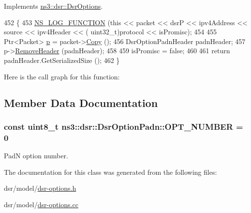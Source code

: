 Implements \hyperlink{classns3_1_1dsr_1_1DsrOptions_ac34fb87a95464f3ea9d82ad12253a5cc}{ns3\+::dsr\+::\+Dsr\+Options}.


\begin{DoxyCode}
452 \{
453   \hyperlink{log-macros-disabled_8h_a90b90d5bad1f39cb1b64923ea94c0761}{NS\_LOG\_FUNCTION} (\textcolor{keyword}{this} << packet << dsrP << ipv4Address << source << ipv4Header << (
      uint32\_t)protocol << isPromisc);
454 
455   Ptr<Packet> \hyperlink{lte__link__budget_8m_ac9de518908a968428863f829398a4e62}{p} = packet->\hyperlink{classns3_1_1Packet_a5d5c70802a5f77fc5f0001e0cfc1898b}{Copy} ();
456   DsrOptionPadnHeader padnHeader;
457   p->\hyperlink{classns3_1_1Packet_a0961eccf975d75f902d40956c93ba63e}{RemoveHeader} (padnHeader);
458 
459   isPromisc = \textcolor{keyword}{false};
460 
461   \textcolor{keywordflow}{return} padnHeader.GetSerializedSize ();
462 \}
\end{DoxyCode}


Here is the call graph for this function\+:




\subsection{Member Data Documentation}
\subsubsection[{\texorpdfstring{O\+P\+T\+\_\+\+N\+U\+M\+B\+ER}{OPT_NUMBER}}]{\setlength{\rightskip}{0pt plus 5cm}const uint8\+\_\+t ns3\+::dsr\+::\+Dsr\+Option\+Padn\+::\+O\+P\+T\+\_\+\+N\+U\+M\+B\+ER = 0\hspace{0.3cm}{\ttfamily [static]}}\hypertarget{classns3_1_1dsr_1_1DsrOptionPadn_a42477839592a01edfafe85df30b4e441}{}\label{classns3_1_1dsr_1_1DsrOptionPadn_a42477839592a01edfafe85df30b4e441}


PadN option number. 



The documentation for this class was generated from the following files\+:\begin{DoxyCompactItemize}
\item 
dsr/model/\hyperlink{dsr-options_8h}{dsr-\/options.\+h}\item 
dsr/model/\hyperlink{dsr-options_8cc}{dsr-\/options.\+cc}\end{DoxyCompactItemize}
